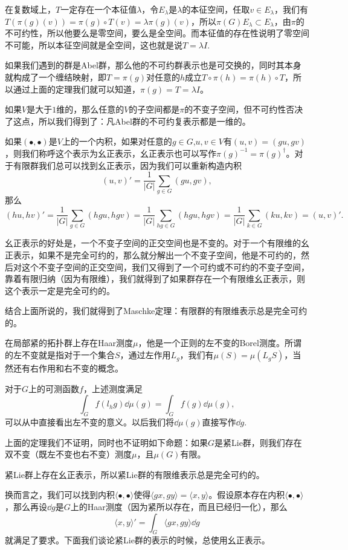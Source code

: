 在复数域上，$T$一定存在一个本征值$\lambda$，令$E_\lambda$是$\lambda$的本征空间，任取$v\in E_\lambda$，我们有$T(\pi(g)(v))=\pi(g)\circ T(v)=\lambda\pi(g)(v)$，所以$\pi(G)E_\lambda\subset E_\lambda$，由$\pi$的不可约性，所以他要么是零空间，要么是全空间。而本征值的存在性说明了零空间不可能，所以本征空间就是全空间，这也就是说$T=\lambda I$.

\para 如果我们遇到的群是Abel群，那么他的不可约群表示也是可交换的，同时其本身就构成了一个缠结映射，即$T=\pi(g)$对任意的$h$成立$T\circ \pi(h)=\pi(h)\circ T$，所以通过上面的定理我们就可以知道，$\pi(g)=T=\lambda I$。

如果$V$是大于$1$维的，那么任意的$V$的子空间都是$\pi$的不变子空间，但不可约性否决了这点，所以我们得到了：凡Abel群的不可约复表示都是一维的。

\para 如果$(\bullet,\bullet)$是$V$上的一个内积，如果对任意的$g\in G$,$u,v\in V$有$(u,v)=(gu,gv)$，则我们称呼这个表示为幺正表示，幺正表示也可以写作$\pi(g)^{-1}=\pi(g)^\dag$。对于有限群我们总可以找到幺正表示，因为我们可以重新构造内积
\[
	(u,v)'=\frac{1}{|G|}\sum_{g\in G}(gu,gv),
\]
那么
\[
	(hu,hv)'=\frac{1}{|G|}\sum_{g\in G}(hgu,hgv)=\frac{1}{|G|}\sum_{hg\in G}(hgu,hgv)=\frac{1}{|G|}\sum_{k\in G}(ku,kv)=(u,v)'.
\]

幺正表示的好处是，一个不变子空间的正交空间也是不变的。对于一个有限维的幺正表示，如果不是完全可约的，那么就分解出一个不变子空间，他是不可约的，然后对这个不变子空间的正交空间，我们又得到了一个可约或不可约的不变子空间，靠着有限归纳（因为有限维），我们就得到了如果群存在一个有限维幺正表示，则这个表示一定是完全可约的。

\theo 结合上面所说的，我们就得到了Maschke定理：有限群的有限维表示总是完全可约的。 

\theo 在局部紧的拓扑群上存在Haar测度$\mu$，他是一个正则的左不变的Borel测度。所谓的左不变就是指对于一个集合$S$，通过左作用$L_g$，我们有$\mu(S)=\mu(L_gS)$，当然还有右作用和右不变的概念。

对于$G$上的可测函数$f$，上述测度满足
\[
	\int_G f(l_h g)\dd \mu(g)=\int_G f(g)\dd \mu(g),
\]
可以从中直接看出左不变的意义。以后我们将$\dd \mu(g)$直接写作$\dd g$.

\para 上面的定理我们不证明，同时也不证明如下命题：如果$G$是紧Lie群，则我们存在双不变（既左不变也右不变）测度$\mu$，且$\mu(G)$有限。

\pro 紧Lie群上存在幺正表示，所以紧Lie群的有限维表示总是完全可约的。 

换而言之，我们可以找到内积$\langle \bullet,\bullet\rangle$使得$\langle gx,gy\rangle=\langle x,y\rangle$。假设原本存在内积$\langle \bullet,\bullet \rangle$，那么再设$\dd g$是$G$上的Haar测度（因为紧所以存在，而且已经归一化），那么
\[
	\langle x,y\rangle'=\int_G \langle gx,gy \rangle \dd g
\]
就满足了要求。下面我们谈论紧Lie群的表示的时候，总使用幺正表示。

